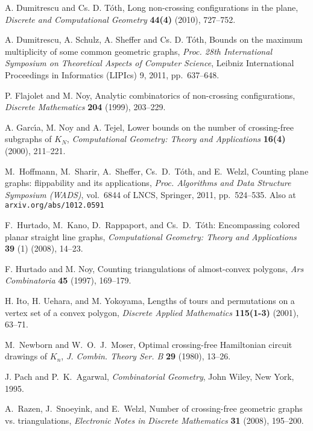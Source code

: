 \documentclass[11pt]{article}
\begin{document}
\begin{thebibliography}{99}
 A. Dumitrescu and Cs. D. T\'oth,
Long non-crossing configurations in the plane,
{\em Discrete and Computational Geometry} {\bf 44(4)} (2010), 727--752.

 A. Dumitrescu, A. Schulz, A. Sheffer and Cs. D. T\'oth,
Bounds on the maximum multiplicity of some common geometric graphs,
\emph{Proc. 28th International Symposium on Theoretical Aspects of
  Computer Science}, Leibniz International Proceedings in Informatics
(LIPIcs) 9, 2011, pp.~637--648.


 P. Flajolet and M. Noy,
Analytic combinatorics of non-crossing configurations,
{\em Discrete Mathematics} {\bf 204} (1999), 203--229.


 A. Garc\'{\i}a, M. Noy and A. Tejel,
Lower bounds on the number of crossing-free subgraphs of $K_N$,
{\em Computational Geometry: Theory and Applications}
{\bf 16(4)} (2000), 211--221.




M.~Hoffmann, M.~Sharir, A.~Sheffer, Cs.~D.~T\'oth, and E.~Welzl,
Counting plane graphs: flippability and its applications,
{\em Proc. Algorithms and Data Structure Symposium (WADS)},
vol.~6844 of LNCS, Springer, 2011, pp.~524--535.
Also at \verb+arxiv.org/abs/1012.0591+


F.~Hurtado, M.~Kano, D.~Rappaport, and Cs.~D.~T\'oth:
Encompassing colored planar straight line graphs,
{\em Computational Geometry: Theory and Applications}
{\bf 39} (1) (2008), 14--23.

 F. Hurtado and M. Noy,
Counting triangulations of almost-convex polygons,
{\em Ars Combinatoria} {\bf 45} (1997), 169--179.


 H. Ito, H. Uehara, and M. Yokoyama,
Lengths of tours and permutations on a vertex set of a convex polygon,
{\em Discrete Applied Mathematics} {\bf 115(1-3)} (2001), 63--71.




M.~Newborn and W.~O.~J.~Moser,
Optimal crossing-free {H}amiltonian circuit drawings of $K_n$,
{\em J. Combin. Theory Ser. B} {\bf 29} (1980), 13--26.

J. Pach and P.~K.~Agarwal,
{\em Combinatorial Geometry},
John Wiley, New York, 1995.


A.~Razen, J.~Snoeyink, and E.~Welzl,
Number of crossing-free geometric graphs vs. triangulations,
\emph{Electronic Notes in Discrete Mathematics}
{\bf 31} (2008), 195--200.


\end{thebibliography}
\end{document}
